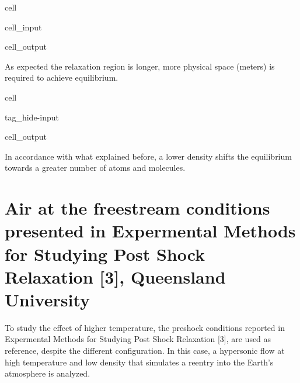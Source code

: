 \documentclass[letterpaper,10pt,english]{jupyterBook}
\begin{document}
\begin{sphinxuseclass}{cell}
\begin{sphinxVerbatimInput}
\begin{sphinxuseclass}{cell_input}
\begin{sphinxVerbatim}[commandchars=\\\{\}]
\end{sphinxVerbatim}

\end{sphinxuseclass}\end{sphinxVerbatimInput}
\begin{sphinxVerbatimOutput}

\begin{sphinxuseclass}{cell_output}
\noindent{}

\end{sphinxuseclass}\end{sphinxVerbatimOutput}

\end{sphinxuseclass}
\sphinxAtStartPar
As expected the relaxation region is longer, more physical space (meters) is required to achieve equilibrium.

\begin{sphinxuseclass}{cell}
\begin{sphinxuseclass}{tag_hide-input}\begin{sphinxVerbatimOutput}

\begin{sphinxuseclass}{cell_output}
\noindent{}

\end{sphinxuseclass}\end{sphinxVerbatimOutput}

\end{sphinxuseclass}
\end{sphinxuseclass}
\sphinxAtStartPar
In accordance with what explained before, a lower density shifts the equilibrium towards a greater number of atoms and molecules.


\section{Air at the free\sphinxhyphen{}stream conditions presented in Expermental Methods for Studying Post Shock Relaxation {[}3{]}, Queensland University}
\label{\detokenize{Results/Results:air-at-the-free-stream-conditions-presented-in-expermental-methods-for-studying-post-shock-relaxation-3-queensland-university}}
\sphinxAtStartPar
To study the effect of higher temperature, the pre\sphinxhyphen{}shock conditions reported in Expermental Methods for Studying Post Shock Relaxation {[}3{]}, are used as reference, despite the different configuration. In this case, a hypersonic flow at high temperature and low density that simulates a re\sphinxhyphen{}entry into the Earth’s atmosphere is analyzed.
\end{document}

